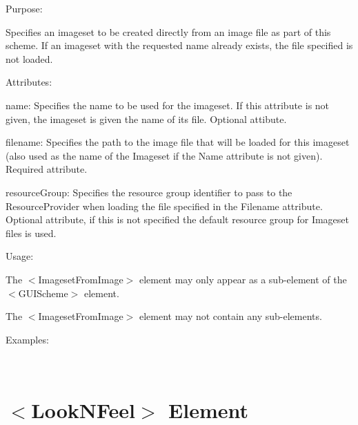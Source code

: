 \begin{DoxyItemize}
\item Purpose\+:
\begin{DoxyItemize}
\item Specifies an imageset to be created directly from an image file as part of this scheme. If an imageset with the requested name already exists, the file specified is not loaded.
\end{DoxyItemize}
\item Attributes\+:
\begin{DoxyItemize}
\item {\ttfamily name\+:} Specifies the name to be used for the imageset. If this attribute is not given, the imageset is given the name of it\textquotesingle{}s file. Optional attibute.
\item {\ttfamily filename\+:} Specifies the path to the image file that will be loaded for this imageset (also used as the name of the Imageset if the {\ttfamily Name} attribute is not given). Required attribute.
\item {\ttfamily resource\+Group\+:} Specifies the resource group identifier to pass to the Resource\+Provider when loading the file specified in the {\ttfamily Filename} attribute. Optional attribute, if this is not specified the default resource group for Imageset files is used.
\end{DoxyItemize}
\item Usage\+:
\begin{DoxyItemize}
\item The $<$Imageset\+From\+Image$>$ element may only appear as a sub-\/element of the $<$G\+U\+I\+Scheme$>$ element.
\item The $<$Imageset\+From\+Image$>$ element may not contain any sub-\/elements.
\end{DoxyItemize}
\item Examples\+:
\end{DoxyItemize}

~\newline
 \hypertarget{xml_scheme_xml_scheme_looknfeel}{}\section{$<$\+Look\+N\+Feel$>$ Element}\label{xml_scheme_xml_scheme_looknfeel}

